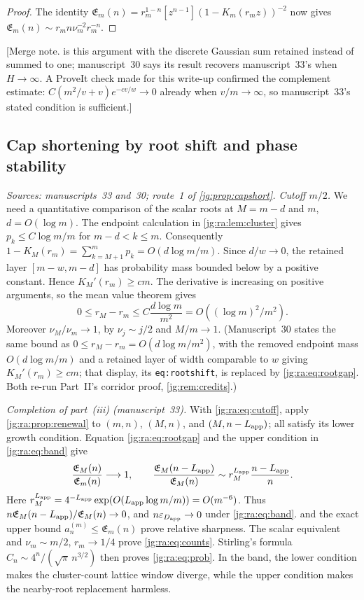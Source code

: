 \documentclass[11pt,a4paper]{article}
\theoremstyle{definition}\newaliascnt{definition}{theorem}
\theoremstyle{remark}\newaliascnt{remark}{theorem}
\newcommand{\eps}{\varepsilon}
\begin{document}
\begin{proof}
The identity $\mathfrak E_m(n)=r_m^{1-n}[z^{n-1}](1-K_m(r_mz))^{-2}$ now gives
$\mathfrak E_m(n)\sim r_mn\nu_m^{-2}r_m^{-n}$.
\end{proof}

[Merge note.  is this argument with the discrete
Gaussian sum retained instead of summed to one; manuscript~30 says its result
recovers manuscript~33's when $H\to\infty$. A ProveIt check made for this
write-up confirmed the complement estimate: $C(m^2/v+v)e^{-cv/w}\to0$ already
when $v/m\to\infty$, so manuscript~33's stated condition is sufficient.]

\subsection{Cap shortening by root shift and phase stability}
\label{jg:sec:theta-cap}
\emph{Sources: manuscripts~33 and~30; route~1 of \cref{jg:prop:capshort}.
Cutoff $m/2$.} We need a quantitative comparison of the scalar roots at
$M=m-d$ and $m$, $d=O(\log m)$. The endpoint calculation in
\cref{jg:ra:lem:cluster} gives $p_k\le C\log m/m$ for $m-d<k\le m$.
Consequently $1-K_M(r_m)=\sum_{k=M+1}^mp_k=O(d\log m/m)$. Since $d/w\to0$, the
retained layer $[m-w,m-d]$ has probability mass bounded below by a positive
constant. Hence $K_M'(r_m)\ge cm$. The derivative is increasing on positive
arguments, so the mean value theorem gives
\begin{equation}\label{jg:ra:eq:rootgap}
 0\le r_M-r_m
 \le C\frac{d\log m}{m^2}
 =O((\log m)^2/m^2).
\end{equation}
Moreover $\nu_M/\nu_m\to1$, by $\nu_j\sim j/2$ and $M/m\to1$. (Manuscript~30
states the same bound as $0\le r_M-r_m=O(d\log m/m^2)$, with the removed
endpoint mass $O(d\log m/m)$ and a retained layer of width comparable to $w$
giving $K_M'(r_m)\ge cm$; that display, its \texttt{eq:rootshift}, is replaced
by \eqref{jg:ra:eq:rootgap}. Both re-run Part~II's corridor proof,
\cref{jg:rem:credits}.)

\emph{Completion of part~(iii) (manuscript~33).} With \eqref{jg:ra:eq:cutoff},
apply \cref{jg:ra:prop:renewal} to $(m,n)$, $(M,n)$, and $(M,n-L_{\rm app})$;
all satisfy its lower growth condition. Equation \eqref{jg:ra:eq:rootgap} and the
upper condition in \eqref{jg:ra:eq:band} give
\begin{equation}\label{jg:ra:eq:ratios}
 \frac{\mathfrak E_M(n)}{\mathfrak E_m(n)}\longrightarrow1,\qquad
 \frac{\mathfrak E_M(n-L_{\rm app})}{\mathfrak E_M(n)}
       \sim r_M^{L_{\rm app}}\frac{n-L_{\rm app}}{n}.
\end{equation}
Here $r_M^{L_{\rm app}}=4^{-L_{\rm app}}\exp(O(L_{\rm app}\log m/m))=O(m^{-6})$.
Thus $n\mathfrak E_M(n-L_{\rm app})/\mathfrak E_M(n)\to0$, and
$n\eps_{D_{\rm app}}\to0$ under \eqref{jg:ra:eq:band}. 
and the exact upper bound $a_n^{(m)}\le\mathfrak E_m(n)$ prove relative
sharpness. The scalar equivalent and $\nu_m\sim m/2$, $r_m\to1/4$ prove
\eqref{jg:ra:eq:counts}. Stirling's formula $C_n\sim4^n/(\sqrt\pi\,n^{3/2})$
then proves \eqref{jg:ra:eq:prob}. In the band, the lower condition makes the
cluster-count lattice window diverge, while the upper condition makes the
nearby-root replacement harmless.
\end{document}
